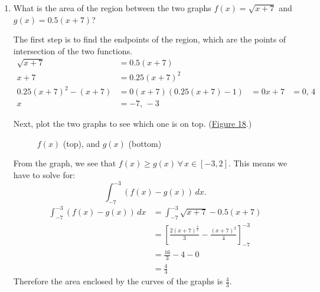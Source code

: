 \documentclass[12pt]{article}
\begin{document}
\begin{enumerate}
    \item What is the area of the region between the two graphs $f(x) = \sqrt{x+7}$ and $g(x) = 0.5(x+7)$?

          The first step is to find the endpoints of the region, which are the points of intersection of the two functions.
          \begin{align*}
              \sqrt{x+7}                         & = 0.5(x+7)    \\
              x+7                                & = 0.25(x+7)^2 \\
              0.25(x+7)^2 - (x+7)                & = 0
              (x+7) \left( 0.25(x+7) - 1 \right) & = 0
              x+7                                & = 0, \, 4     \\
              x                                  & = -7, \, -3
          \end{align*}

          Next, plot the two graphs to see which one is on top. (\hyperref[fig:abcx2]{Figure 18}.)

          \begin{figure}[H]
              \begin{center}
                  \caption{$f(x)$ (top), and $g(x)$ (bottom)}
                  \label{fig:abcx2}
              \end{center}
          \end{figure}

          From the graph, we see that $f(x) \ge g(x) \, \forall \, x \in [-3, 2]$. This means we have to solve for:
          \[ \int_{-7}^{-3} \left( f(x) - g(x) \right) \, dx. \]
          \begin{align*}
              \int_{-7}^{-3} \left( f(x) - g(x) \right) \, dx & = \int_{-7}^{-3} \sqrt{x+7} - 0.5(x+7)                                      \\[6pt]
                                                              & = \left[ \frac{2(x+7)^\frac{3}{2}}{3} - \frac{(x+7)^2}{4} \right]_{-7}^{-3} \\[6pt]
                                                              & = \frac{16}{3} - 4 - 0                                                      \\[6pt]
                                                              & = \frac{4}{3}
          \end{align*}
          Therefore the area enclosed by the curves of the graphs is $\frac{4}{3}$.
\end{enumerate}
\end{document}
